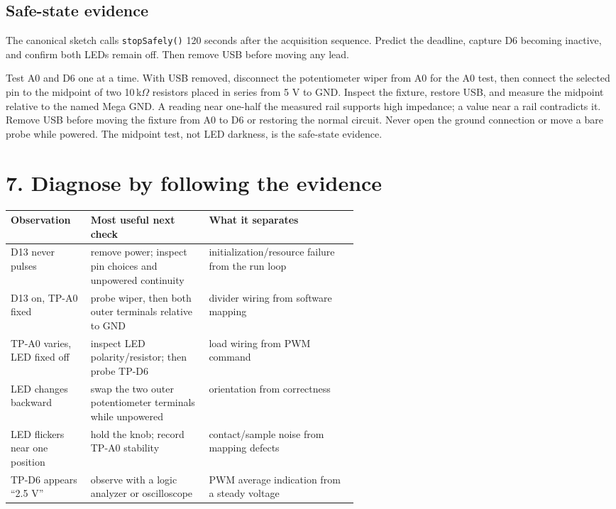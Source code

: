 \documentclass[11pt]{article}
\begin{document}
\subsection*{Safe-state evidence}

The canonical sketch calls \texttt{stopSafely()} 120 seconds after the
acquisition sequence. Predict the deadline, capture D6 becoming inactive, and
confirm both LEDs remain off. Then remove USB before moving any lead.

Test A0 and D6 one at a time. With USB removed, disconnect the potentiometer
wiper from A0 for the A0 test, then connect the selected pin to the midpoint
of two 10\,k\(\Omega\) resistors placed in series from 5 V to GND. Inspect the
fixture, restore USB, and measure the midpoint relative to the named Mega GND.
A reading near one-half the measured rail supports high impedance; a value
near a rail contradicts it. Remove USB before moving the fixture from A0 to
D6 or restoring the normal circuit. Never open the ground connection or move
a bare probe while powered. The midpoint test, not LED darkness, is the
safe-state evidence.

\section*{7. Diagnose by following the evidence}

\begin{center}
\begin{tabularx}{\linewidth}{@{}p{0.23\linewidth}p{0.34\linewidth}X@{}}
\toprule
Observation & Most useful next check & What it separates\\
\midrule
D13 never pulses & remove power; inspect pin choices and unpowered continuity &
initialization/resource failure from the run loop\\
D13 on, TP-A0 fixed & probe wiper, then both outer terminals relative to GND &
divider wiring from software mapping\\
TP-A0 varies, LED fixed off & inspect LED polarity/resistor; then probe TP-D6 &
load wiring from PWM command\\
LED changes backward & swap the two outer potentiometer terminals while
unpowered & orientation from correctness\\
LED flickers near one position & hold the knob; record TP-A0 stability &
contact/sample noise from mapping defects\\
TP-D6 appears ``2.5 V'' & observe with a logic analyzer or oscilloscope &
PWM average indication from a steady voltage\\
\bottomrule
\end{tabularx}
\end{center}
\end{document}
